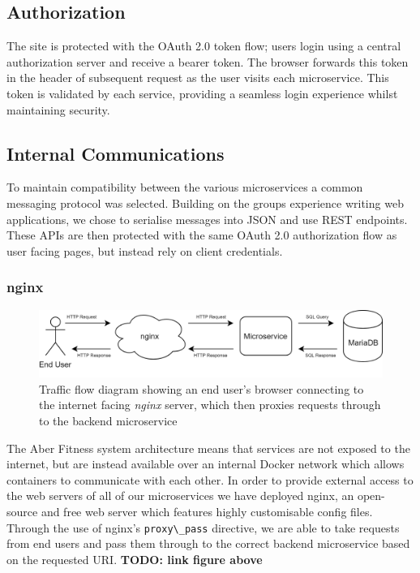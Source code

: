 \subsection{Authorization}
    \par
    The site is protected with the OAuth 2.0 token flow; users login using a central authorization server and receive a bearer token. The browser forwards this token in the header of subsequent request as the user visits each microservice. This token is validated by each service, providing a seamless login experience whilst maintaining security.

\subsection{Internal Communications}
    \par
    To maintain compatibility between the various microservices a common messaging protocol was selected. Building on the groups experience writing web applications, we chose to serialise messages into JSON and use REST endpoints. These APIs are then protected with the same OAuth 2.0 authorization flow as user facing pages, but instead rely on client credentials.

\subsubsection{nginx}
    \begin{figure}[H]
        \centering
        \includegraphics[width=\textwidth]{Images/nginx_proxy_flow.png}
        \caption{Traffic flow diagram showing an end user's browser connecting to the internet facing \textit{nginx} server, which then proxies requests through to the backend microservice}
    \end{figure}
    
    The Aber Fitness system architecture means that services are not exposed to the internet, but are instead available over an internal Docker network which allows containers to communicate with each other. In order to provide external access to the web servers of all of our microservices we have deployed nginx, an open-source and free web server which features highly customisable config files. Through the use of nginx's \lstinline{proxy\_pass} directive, we are able to take requests from end users and pass them through to the correct backend microservice based on the requested URI. \textbf{TODO: link figure above}
    

